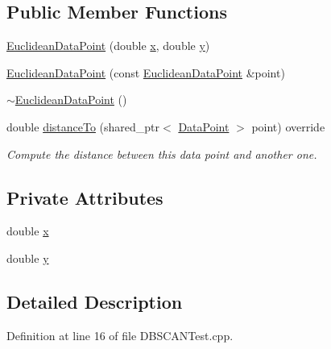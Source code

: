 \subsection*{\-Public \-Member \-Functions}
\begin{DoxyCompactItemize}
\item 
\hyperlink{classEuclideanDataPoint_acda27e957f18603d1b790d037ab5b74a}{\-Euclidean\-Data\-Point} (double \hyperlink{classEuclideanDataPoint_a7d3a3555621c6fd195f2f0543e04eaf6}{x}, double \hyperlink{classEuclideanDataPoint_a108d29336be8bf0bd1aa53c40df3bd68}{y})
\item 
\hyperlink{classEuclideanDataPoint_a8037034faddfd74eb85f7879bb8e7e06}{\-Euclidean\-Data\-Point} (const \hyperlink{classEuclideanDataPoint}{\-Euclidean\-Data\-Point} \&point)
\item 
\hyperlink{classEuclideanDataPoint_a8ee5a1033aba4baa58692f0ae896fbf8}{$\sim$\-Euclidean\-Data\-Point} ()
\item 
double \hyperlink{classEuclideanDataPoint_a86ac3981ea67375c7854e9d84446f8e5}{distance\-To} (shared\-\_\-ptr$<$ \hyperlink{classmultiscale_1_1analysis_1_1DataPoint}{\-Data\-Point} $>$ point) override
\begin{DoxyCompactList}\small\item\em \-Compute the distance between this data point and another one. \end{DoxyCompactList}\end{DoxyCompactItemize}
\subsection*{\-Private \-Attributes}
\begin{DoxyCompactItemize}
\item 
double \hyperlink{classEuclideanDataPoint_a7d3a3555621c6fd195f2f0543e04eaf6}{x}
\item 
double \hyperlink{classEuclideanDataPoint_a108d29336be8bf0bd1aa53c40df3bd68}{y}
\end{DoxyCompactItemize}


\subsection{\-Detailed \-Description}


\-Definition at line 16 of file \-D\-B\-S\-C\-A\-N\-Test.\-cpp.



